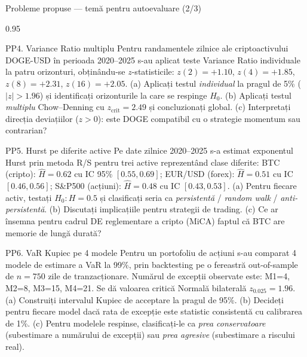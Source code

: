 \documentclass[9pt, aspectratio=169, t]{beamer}
\begin{document}
\begin{frame}[shrink=25]{Probleme propuse --- temă pentru autoevaluare (2/3)}
\begin{cminipage}{0.95\textwidth}
\begin{block}{PP4. Variance Ratio multiplu}
Pentru randamentele zilnice ale criptoactivului DOGE-USD în perioada 2020--2025 s-au aplicat teste Variance Ratio individuale la patru orizonturi, obținându-se $z$-statisticile: $z(2)=+1.10$, $z(4)=+1.85$, $z(8)=+2.31$, $z(16)=+2.05$. (a) Aplicați testul \emph{individual} la pragul de 5\% ($|z|>1.96$) și identificați orizonturile la care se respinge $H_0$. (b) Aplicați testul \emph{multiplu} Chow--Denning cu $z_{\text{crit}}=2.49$ și concluzionați global. (c) Interpretați direcția deviațiilor ($z>0$): este DOGE compatibil cu o strategie momentum sau contrarian?
\end{block}
\begin{block}{PP5. Hurst pe diferite active}
Pe date zilnice 2020--2025 s-a estimat exponentul Hurst prin metoda R/S pentru trei active reprezentând clase diferite: BTC (cripto): $\hat H=0.62$ cu IC 95\% $[0.55, 0.69]$; EUR/USD (forex): $\hat H=0.51$ cu IC $[0.46, 0.56]$; S\&P500 (acțiuni): $\hat H=0.48$ cu IC $[0.43, 0.53]$. (a) Pentru fiecare activ, testați $H_0:H=0.5$ și clasificați seria ca \emph{persistentă} / \emph{random walk} / \emph{anti-persistentă}. (b) Discutați implicațiile pentru strategii de trading. (c) Ce ar însemna pentru cadrul DE reglementare a cripto (MiCA) faptul că BTC are memorie de lungă durată?
\end{block}
\begin{block}{PP6. VaR Kupiec pe 4 modele}
Pentru un portofoliu de acțiuni s-au comparat 4 modele de estimare a VaR la 99\%, prin backtesting pe o fereastră out-of-sample de $n=750$ zile de tranzacționare. Numărul de excepții observate este: M1=4, M2=8, M3=15, M4=21. Se dă valoarea critică Normală bilaterală $z_{0.025}=1.96$. (a) Construiți intervalul Kupiec de acceptare la pragul de 95\%. (b) Decideți pentru fiecare model dacă rata de excepție este statistic consistentă cu calibrarea de 1\%. (c) Pentru modelele respinse, clasificați-le ca \emph{prea conservatoare} (subestimare a numărului de excepții) sau \emph{prea agresive} (subestimare a riscului real).
\end{block}
\end{cminipage}
\end{frame}
\end{document}
